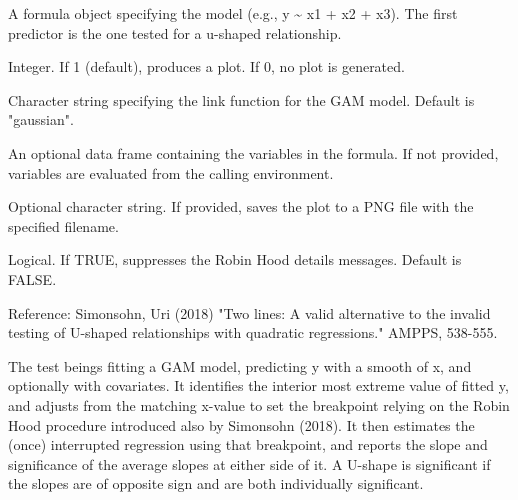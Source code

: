 \documentclass[a4paper]{book}
\begin{document}
\begin{Arguments}
\begin{ldescription}
\item[\code{f}] A formula object specifying the model (e.g., y \textasciitilde{} x1 + x2 + x3).
The first predictor is the one tested for a u-shaped relationship.

\item[\code{graph}] Integer. If 1 (default), produces a plot. If 0, no plot is generated.

\item[\code{link}] Character string specifying the link function for the GAM model.
Default is "gaussian".

\item[\code{data}] An optional data frame containing the variables in the formula.
If not provided, variables are evaluated from the calling environment.

\item[\code{pngfile}] Optional character string. If provided, saves the plot to a PNG file
with the specified filename.

\item[\code{quiet}] Logical. If TRUE, suppresses the Robin Hood details messages.
Default is FALSE.
\end{ldescription}
\end{Arguments}
%
\begin{Details}
Reference: 
Simonsohn, Uri (2018) "Two lines: A valid alternative to the invalid testing of 
U-shaped relationships with quadratic regressions." AMPPS, 538-555. 


The test beings fitting a GAM model, predicting y with a smooth of x, and optionally with covariates. 
It identifies the interior most extreme value of fitted y, and adjusts from the matching x-value 
to set the breakpoint relying on the Robin Hood procedure introduced also by Simonsohn (2018).
It then estimates the (once) interrupted regression using that breakpoint,
and reports the slope and significance of the average slopes at either side of it. A U-shape 
is significant if the slopes are of opposite sign and are both individually significant.
\end{Details}
%
\end{document}

